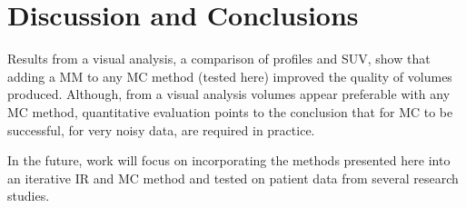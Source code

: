 
\section{Discussion and Conclusions} \label{sec:discussion_and_conclusions}
    Results from a visual analysis, a comparison of profiles and \gls{SUV}, show that adding a \gls{MM} to any \gls{MC} method (tested here) improved the quality of volumes produced. Although, from a visual analysis volumes appear preferable with any \gls{MC} method, quantitative evaluation points to the conclusion that for \gls{MC} to be successful, for very noisy data,  are required in practice.
    
    In the future, work will focus on incorporating the methods presented here into an iterative \acrlong{IR} and \gls{MC} method and tested on patient data from several research studies.%
    